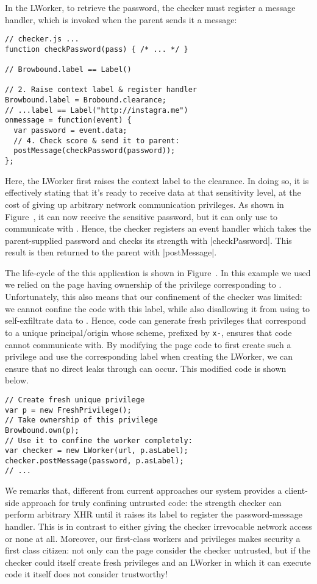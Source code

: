 In the LWorker, to retrieve the password, the checker must register a
message handler, which is invoked when the parent sends it a message:
\begin{lstlisting}
// checker.js ...
function checkPassword(pass) { /* ... */ }

// Browbound.label == Label()

// 2. Raise context label & register handler
Browbound.label = Brobound.clearance;
// ...label == Label("http://instagra.me")
onmessage = function(event) {
  var password = event.data;
  // 4. Check score & send it to parent:
  postMessage(checkPassword(password));
};
\end{lstlisting}
%
Here, the LWorker first raises the context label to the clearance.
%
In doing so, it is effectively stating that it's ready to receive data
at that sensitivity level, at the cost of giving up arbitrary network
communication privileges.
%
As shown in Figure~, it can now receive the
sensitive password, but it can only use \xhr{} to communicate with
.
%
Hence, the checker registers an event handler which takes the
parent-supplied password and checks its strength with
\js|checkPassword|.
%
This result is then returned to the parent with \js|postMessage|.

The life-cycle of the this application is shown in
Figure~.
%
In this example we used we relied on the page having ownership of the
privilege corresponding to .
%
Unfortunately, this also means that our confinement of the checker was
limited: we cannot confine the code with this label, while also
disallowing it from using \xhr{} to self-exfiltrate data to
.
%
Hence, code can generate fresh privileges that correspond to a unique
principal/origin whose scheme, prefixed by \texttt{x-}, ensures that
code cannot communicate with.
%
By modifying the page code to first create such a privilege and use
the corresponding label when creating the LWorker, we can ensure that
no direct leaks through \xhr{} can occur.
%
This modified code is shown below.
\begin{lstlisting}
// Create fresh unique privilege
var p = new FreshPrivilege();
// Take ownership of this privilege
Browbound.own(p);
// Use it to confine the worker completely:
var checker = new LWorker(url, p.asLabel);
checker.postMessage(password, p.asLabel);
// ...
\end{lstlisting}
%

%
We remarks that, different from current approaches our system provides
a client-side approach for truly confining untrusted code: the strength
checker can perform arbitrary XHR until it raises its label to
register the password-message handler.
%
This is in contrast to either giving the checker irrevocable network
access or none at all.
%
Moreover, our first-class workers and privileges makes security a
first class citizen: not only can the page consider the checker
untrusted, but if the checker could itself create fresh privileges and
an LWorker in which it can execute code it itself does not consider
trustworthy!

